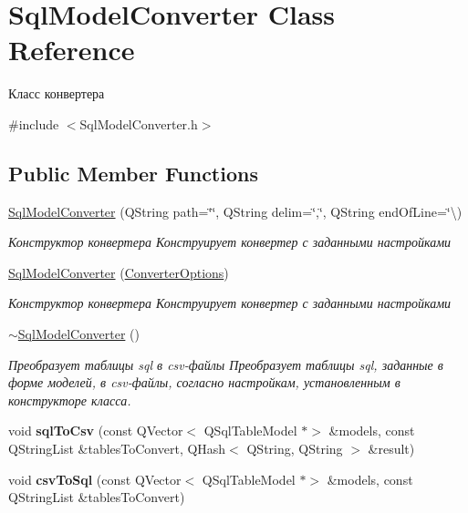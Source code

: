 \hypertarget{class_sql_model_converter}{}\section{Sql\+Model\+Converter Class Reference}
\label{class_sql_model_converter}


Класс конвертера  




{\ttfamily \#include $<$Sql\+Model\+Converter.\+h$>$}

\subsection*{Public Member Functions}
\begin{DoxyCompactItemize}
\item 
\mbox{\hyperlink{class_sql_model_converter_af7cf0d9772323b9707697f0ab4fc4e77}{Sql\+Model\+Converter}} (Q\+String path=\char`\"{}\char`\"{}, Q\+String delim=\char`\"{},\char`\"{}, Q\+String end\+Of\+Line=\char`\"{}\textbackslash{})
\begin{DoxyCompactList}\small\item\em Конструктор конвертера Конструирует конвертер с заданными настройками \end{DoxyCompactList}\item 
\mbox{\hyperlink{class_sql_model_converter_a9d2feafdb9c7568370f2c02bb7e5e64f}{Sql\+Model\+Converter}} (\mbox{\hyperlink{class_converter_options}{Converter\+Options}})
\begin{DoxyCompactList}\small\item\em Конструктор конвертера Конструирует конвертер с заданными настройками \end{DoxyCompactList}\item 
\mbox{\hyperlink{class_sql_model_converter_a7b222009300de7e7e77bdba7ad4b8a61}{$\sim$\+Sql\+Model\+Converter}} ()
\begin{DoxyCompactList}\small\item\em Преобразует таблицы sql в csv-\/файлы Преобразует таблицы sql, заданные в форме моделей, в csv-\/файлы, согласно настройкам, установленным в конструкторе класса. \end{DoxyCompactList}\item 
\mbox{\label{class_sql_model_converter_a9cff9f1e0a7dfa36d0a34a8a3188f1ea}} 
void {\bfseries sql\+To\+Csv} (const Q\+Vector$<$ Q\+Sql\+Table\+Model $\ast$$>$ \&models, const Q\+String\+List \&tables\+To\+Convert, Q\+Hash$<$ Q\+String, Q\+String $>$ \&result)
\item 
\mbox{\label{class_sql_model_converter_a55c8e08e01777fe4fe4f3551989544b9}} 
void {\bfseries csv\+To\+Sql} (const Q\+Vector$<$ Q\+Sql\+Table\+Model $\ast$$>$ \&models, const Q\+String\+List \&tables\+To\+Convert)
\end{DoxyCompactItemize}
